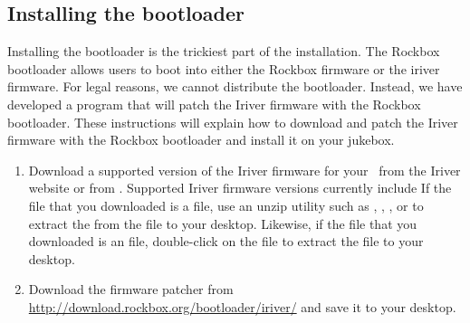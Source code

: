 \subsection{Installing the bootloader}
  Installing the bootloader is the trickiest part of the installation.
  The Rockbox bootloader allows users to boot into either the Rockbox 
  firmware or the iriver firmware. For legal reasons, we cannot distribute 
  the bootloader. Instead, we have developed a program that will patch the 
  Iriver firmware with the Rockbox bootloader. These instructions will explain 
  how to download and patch the Iriver firmware with the Rockbox bootloader 
  and install it on your jukebox.

\begin{enumerate}
  \item Download a supported version of the Iriver firmware for your 
  \playername\ from the Iriver website or from 
  .
  Supported Iriver firmware versions currently include 
  If the file that you downloaded is a  file, use an unzip 
  utility such as , , ,	or 
   to extract the  from the  file
  to your desktop. Likewise, if the file that you downloaded is an 
   file, double-click on the 	file to extract 
  the  file to your desktop.
  \item Download the firmware patcher  from 
  \url{http://download.rockbox.org/bootloader/iriver/} and save it to your desktop.
\end{enumerate}
